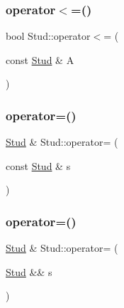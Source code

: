 \mbox{\label{class_stud_adc0b5c12c3c26fdc2c0baaba9df2619c}} 
\subsubsection{\texorpdfstring{operator$<$=()}{operator<=()}}
{\footnotesize\ttfamily bool Stud\+::operator$<$= (\begin{DoxyParamCaption}\item[{const \mbox{\hyperlink{class_stud}{Stud}} \&}]{A }\end{DoxyParamCaption})}

\mbox{\label{class_stud_a94d010cba4832e52eea069005bf7db04}} 
\subsubsection{\texorpdfstring{operator=()}{operator=()}\hspace{0.1cm}{\footnotesize\ttfamily [1/2]}}
{\footnotesize\ttfamily \mbox{\hyperlink{class_stud}{Stud}} \& Stud\+::operator= (\begin{DoxyParamCaption}\item[{const \mbox{\hyperlink{class_stud}{Stud}} \&}]{s }\end{DoxyParamCaption})}

\mbox{\label{class_stud_af5458aac5c975c0b6e35a40fac81756d}} 
\subsubsection{\texorpdfstring{operator=()}{operator=()}\hspace{0.1cm}{\footnotesize\ttfamily [2/2]}}
{\footnotesize\ttfamily \mbox{\hyperlink{class_stud}{Stud}} \& Stud\+::operator= (\begin{DoxyParamCaption}\item[{\mbox{\hyperlink{class_stud}{Stud}} \&\&}]{s }\end{DoxyParamCaption})\hspace{0.3cm}{\ttfamily [noexcept]}}

\mbox{\label{class_stud_ab6f87c50382f7662173f363b012fd0b9}} 
